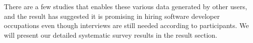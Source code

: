There are a few studies \cite{hiring2016sarma} that enables these various data generated by other users, and the result has suggested it is promising in hiring software developer occupations even though interviews are still needed according to participants. We will present our detailed systematic survey results in the result section.